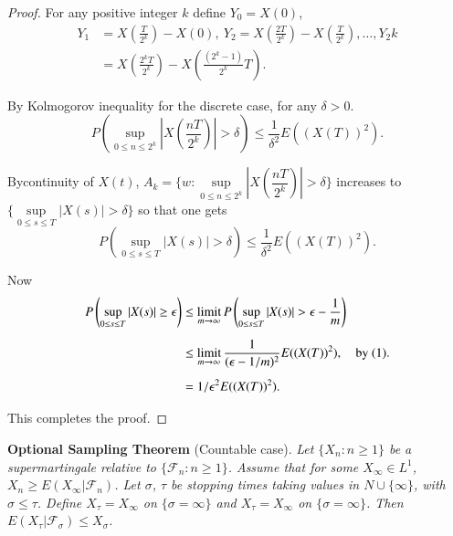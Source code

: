 \begin{proof}
For any positive integer $k$ define $Y_{0}=X(0)$,
\begin{align*}
Y_{1}
&=X\left(\frac{T}{2^{k}}\right)-X(0),\ Y_{2}=X\left(\frac{2T}{2^{k}}\right)-X\left(\frac{T}{2^{k}}\right),\ldots,Y_{2}k\\
&=X\left(\frac{2^{k}T}{2^{k}}\right)-X\left(\frac{(2^{k}-1)}{2^{k}}T\right). 
\end{align*}

By Kolmogorov inequality for the discrete case, for any $\delta>0$.
$$
P\left(\sup\limits_{0\leq n\leq
  2^{k}}|X\left(\frac{nT}{2^{k}}\right)|>\delta\right)\leq
\frac{1}{\delta^{2}}E((X(T))^{2}). 
$$

By\pageoriginale continuity of $X(t)$, $A_{k}=\{w:\sup\limits_{0\leq
  n\leq 2^{k}}|X\left(\dfrac{nT}{2^{k}}\right)|>\delta\}$ increases to
$\{\sup\limits_{0\leq s\leq T}|X(s)|>\delta\}$ so that one gets
\begin{equation*}
P\left(\sup\limits_{0\leq s\leq T}|X(s)|>\delta\right)\leq
\frac{1}{\delta^{2}}E((X(T))^{2}).\tag{1} 
\end{equation*}

Now 
\begin{align*}
P\left(\sup\limits_{0\leq s\leq T}|X(s)|\geq \epsilon\right) &\leq
\limit\limits_{m\to \infty}P\left(\sup\limits_{0\leq s\leq
  T}|X(s)|>\epsilon-\frac{1}{m}\right)\\[5pt] 
&\leq \limit\limits_{m\to
  \infty}\frac{1}{(\epsilon-1/m)^{2}}E((X(T))^{2}),\q \text{by
  (1).}\\[5pt]
&= 1/\epsilon^{2}E((X(T))^{2}).
\end{align*}

This completes the proof.
\end{proof}

\noindent
{\bf Optional Sampling Theorem} (Countable case). {\em Let $\{X_{n}:n\geq
1\}$ be a supermartingale relative to $\{\mathscr{F}_{n}:n\geq
1\}$. Assume that for some $X_{\infty}\in L^{1}$, $X_{n}\geq
E(X_{\infty}|\mathscr{F}_{n})$. Let $\sigma$, $\tau$ be stopping times
taking values in $N\cup \{\infty\}$, with $\sigma\leq \tau$. Define
$X_{\tau}=X_{\infty}$ on $\{\sigma=\infty\}$ and $X_{\tau}=X_{\infty}$
on $\{\sigma=\infty\}$. Then $E(X_{\tau}|\mathscr{F}_{\sigma})\leq
X_{\sigma}$.}

